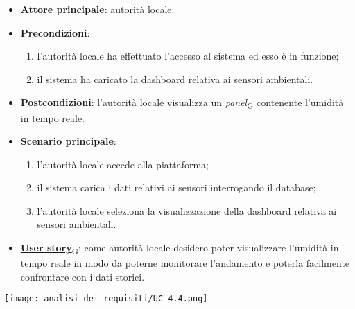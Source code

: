 \begin{itemize}
	\item \textbf{Attore principale}: autorità locale.
	\item \textbf{Precondizioni}:
	      \begin{enumerate}
		      \item l'autorità locale ha effettuato l'accesso al sistema ed esso è in funzione;
		      \item il sistema ha caricato la dashboard relativa ai sensori ambientali.
	      \end{enumerate}
	\item \textbf{Postcondizioni}: l'autorità locale visualizza un \href{https://7last.github.io/docs/rtb/documentazione-interna/glossario\#panel}{\textit{panel}\textsubscript{G}} contenente l'umidità in tempo reale.
	\item \textbf{Scenario principale}:
	      \begin{enumerate}
		      \item l'autorità locale accede alla piattaforma;
		      \item il sistema carica i dati relativi ai sensori interrogando il database;
		      \item l'autorità locale seleziona la visualizzazione della dashboard relativa ai sensori ambientali.
	      \end{enumerate}
	\item \href{https://7last.github.io/docs/rtb/documentazione-interna/glossario\#user-story}{\textbf{User story}\textsubscript{G}}:
	      come autorità locale desidero poter visualizzare l'umidità in tempo reale in modo da poterne monitorare l'andamento
	      e poterla facilmente confrontare con i dati storici.
\end{itemize}
\begin{center}
	\texttt{[image: analisi\_dei\_requisiti/UC-4.4.png]}
\end{center}



